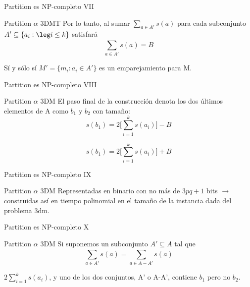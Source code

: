 \documentclass[10pt, mathserif, profesionalfont]{beamer}
\begin{document}
\begin{frame}{Partition es NP-completo VII}
    
\begin{block}{Partition $\alpha$ 3DMT}    
Por lo tanto, al sumar \(\sum_{a \in A'}^{} s(a)\) para cada subconjunto \(A'\subseteq\{a_i:\leg i\leq k\}\) satisfará
\[\sum_{a \in A'}^{} s(a) = B\]
\end{block}

\begin{block}{}
Sí y sólo sí \(M' = \{m_i:a_i \in A'\}\) es un emparejamiento para M.
\end{block}
\end{frame}



\begin{frame}{Partition es NP-completo VIII}
    
\begin{block}{Partition $\alpha$ 3DM}    
El paso final de la construcción denota los dos últimos elementos de A como $b_1$ y $b_2$ con tamaño:
\[s(b_1) = 2 \Big[\sum_{i=1}^{k} s(a_i)\Big] - B\]

\[s(b_1) = 2 \Big[\sum_{i=1}^{k} s(a_i)\Big] + B\]
\end{block}

\end{frame}

\begin{frame}{Partition es NP-completo IX}
    
\begin{block}{Partition $\alpha$ 3DM}    
Representadas en binario con no más de $3pq + 1$ bits $\rightarrow$ construidas así en tiempo polinomial en el tamaño de la instancia dada del problema \gls{3dm}.
\end{block}

\end{frame}



\begin{frame}{Partition es NP-completo X}
    
\begin{block}{Partition $\alpha$ 3DM}    
Si suponemos un subconjunto $A' \subseteq A$ tal que
\[\sum_{a \in A'}^{} s(a) = \sum_{a \in A-A'}^{} s(a)\]
\end{block}
\begin{block}{}
\(2\sum_{i=1}^{k} s(a_i)\), y uno de los dos conjuntos, A' o A-A', contiene $b_1$ pero no $b_2$.
\end{block}
\end{frame}
\end{document}
